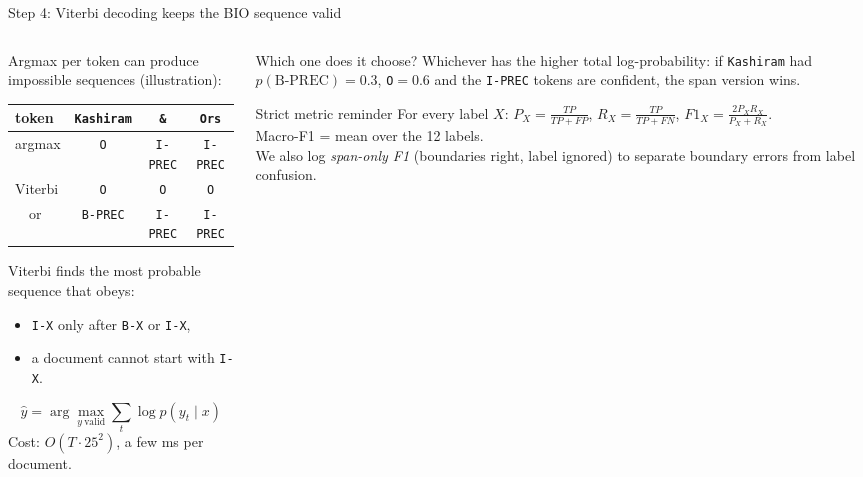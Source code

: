 \documentclass[aspectratio=169,11pt]{beamer}
\newcommand{\code}[1]{\texttt{\small #1}}
\begin{document}
\begin{frame}{Step 4: Viterbi decoding keeps the BIO sequence valid}
  \begin{columns}[T]
    \begin{column}{0.5\textwidth}
      \footnotesize
      Argmax per token can produce impossible sequences (illustration):
      \begin{center}
      \begin{tabular}{@{}lccc@{}}
        \toprule
        token & \code{Kashiram} & \code{\&} & \code{Ors} \\
        \midrule
        argmax & \code{O} & \code{I-PREC} & \code{I-PREC} \\
        Viterbi & \code{O} & \code{O} & \code{O}\\
        \ \ or & \code{B-PREC} & \code{I-PREC} & \code{I-PREC} \\
        \bottomrule
      \end{tabular}
      \end{center}
      Viterbi finds the most probable sequence that obeys:
      \begin{itemize}
        \item \code{I-X} only after \code{B-X} or \code{I-X},
        \item a document cannot start with \code{I-X}.
      \end{itemize}
      $$\hat y = \arg\max_{y\ \text{valid}} \sum_t \log p(y_t \mid x)$$
      Cost: $O(T \cdot 25^2)$, a few ms per document.
    \end{column}
    \begin{column}{0.46\textwidth}
      \footnotesize
      \begin{block}{Which one does it choose?}
        Whichever has the higher total log-probability:
        if \code{Kashiram} had $p(\text{B-PREC}) = 0.3$, \code{O}$=0.6$ and
        the \code{I-PREC} tokens are confident, the span version wins.
      \end{block}
      \begin{block}{Strict metric reminder}
        For every label $X$:
        $P_X = \frac{TP}{TP+FP}$, $R_X = \frac{TP}{TP+FN}$,
        $F1_X = \frac{2P_XR_X}{P_X+R_X}$.\\
        Macro-F1 = mean over the 12 labels.\\
        We also log \emph{span-only F1} (boundaries right, label ignored) to separate
        boundary errors from label confusion.
      \end{block}
    \end{column}
  \end{columns}
\end{frame}
\end{document}
